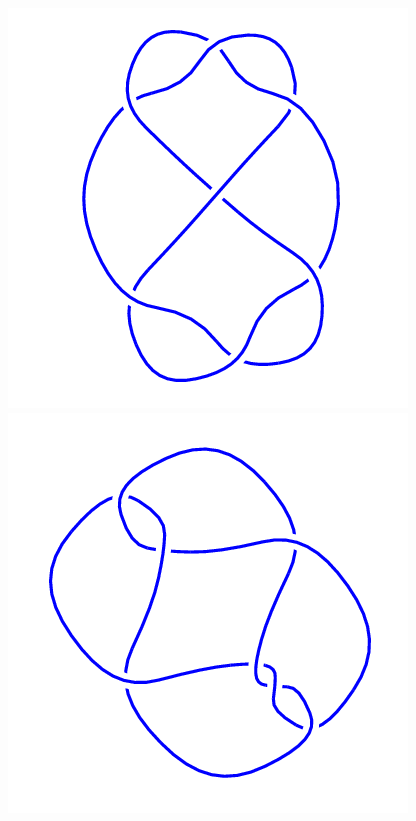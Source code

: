 \begin{figure}[H]
    \begin{minipage}[b]{.18\linewidth}
        \centering
        \includegraphics[width=\linewidth]{../data/7_4.png}
    \end{minipage}
    \begin{minipage}[b]{.18\linewidth}
        \centering
        \includegraphics[width=\linewidth]{../data/7_5.png}

\end{minipage}
\end{figure}
